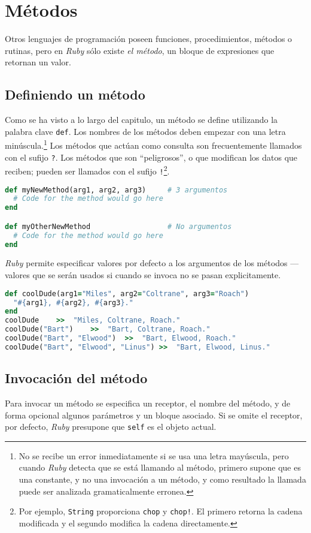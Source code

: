 \section{Métodos}
Otros lenguajes de programación poseen funciones, procedimientos, métodos o rutinas, pero en \textit{Ruby} sólo existe \textit{el método}, un bloque de expresiones que retornan un valor.

\subsection{Definiendo un método}
Como se ha visto a lo largo del capitulo, un método se define utilizando la palabra clave \texttt{def}. Los nombres de los métodos deben empezar con una letra minúscula.\footnote{No se recibe un error inmediatamente si se usa una letra mayúscula, pero cuando \textit{Ruby} detecta que se está llamando al método, primero supone que es una constante, y no una invocación a un método, y como resultado la llamada puede ser analizada gramaticalmente erronea.} Los métodos que actúan como consulta son frecuentemente llamados con el sufijo \texttt{?}. Los métodos que son ``peligrosos'', o que modifican los datos que reciben; pueden ser llamados con el sufijo \texttt{!}\footnote{Por ejemplo, \texttt{String} proporciona \texttt{chop} y \texttt{chop!}. El primero retorna la cadena modificada y el segundo modifica la cadena directamente.}.

\begin{lstlisting}[language=Ruby]
def myNewMethod(arg1, arg2, arg3)     # 3 argumentos
  # Code for the method would go here
end

def myOtherNewMethod                  # No argumentos
  # Code for the method would go here
end
\end{lstlisting}

\textit{Ruby} permite especificar valores por defecto a los argumentos de los métodos ---valores que se serán usados si cuando se invoca no se pasan explicitamente.

\begin{lstlisting}[language=Ruby]
def coolDude(arg1="Miles", arg2="Coltrane", arg3="Roach")
  "#{arg1}, #{arg2}, #{arg3}."
end
coolDude	>>	"Miles, Coltrane, Roach."
coolDude("Bart")	>>	"Bart, Coltrane, Roach."
coolDude("Bart", "Elwood")	>>	"Bart, Elwood, Roach."
coolDude("Bart", "Elwood", "Linus")	>>	"Bart, Elwood, Linus."
\end{lstlisting}

\subsection{Invocación del método}
Para invocar un método se especifica un receptor, el nombre del método, y de forma opcional algunos parámetros y un bloque asociado. Si se omite el receptor, por defecto, \textit{Ruby} presupone que \texttt{self} es el objeto actual.

